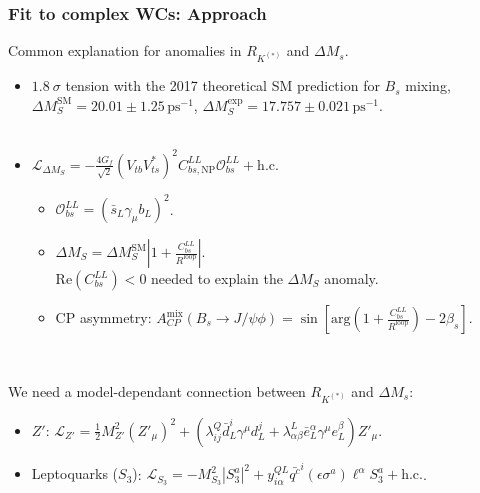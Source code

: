 \documentclass[mathserif, 10pt, dvipsnames]{beamer}
\newcommand\colorcite[1]{{\scriptsize\color{unizarblue}#1}}
\begin{document}
\begin{frame}\frametitle{Fit to complex WCs: Approach}
    Common explanation for anomalies in $R_{K^{(*)}}$ and $\Delta M_s$.
    \begin{itemize}
        \item $1.8\ \sigma$ tension with the 2017 theoretical SM prediction for $B_s$ mixing,\\
$\Delta M_S^\mathrm{SM} = 20.01 \pm 1.25\,\mathrm{ps}^{-1}$, \qquad
$\Delta M_S^\mathrm{exp} = 17.757 \pm 0.021
    \,\mathrm{ps}^{-1}$. \\
\colorcite{{L. Di Luzio, M. Kirk, A. Lenz. arXiv:1712.06572}}\\[0.5em]
\item $\mathcal{L}_{\Delta M_S} = -\frac{4 G_f}{\sqrt{2}}
    (V_{tb} V_{ts}^*)^2 C_{bs, \mathrm{NP}}^{LL}
    \mathcal{O}_{bs}^{LL} + \mathrm{h. c.}$
              \begin{itemize}
\item $ \mathcal{O}_{bs}^{LL} = (\bar{s}_L \gamma_\mu b_L)^2$.
\item $\Delta M_S = \Delta M_S^\mathrm{SM} \left|1 + \frac{C_{bs}^{LL} }{R^\mathrm{loop}} \right|$.\\ $\mathrm{Re}(C_{bs}^{LL})< 0$ needed to explain the $\Delta M_S$ anomaly.
\item CP asymmetry: $A_{CP}^\mathrm{mix} (B_s\to J/\psi \phi)= \sin \left[\mathrm{arg}\left(   1 + \frac{C_{bs}^{LL} }{R^\mathrm{loop}} \right) - 2 \beta_s \right] $.
              \end{itemize}
    \end{itemize}

    ~

    We need a model-dependant connection between $R_{K^{(*)}}$ and $\Delta M_s$:
    \begin{itemize}
\item {\color{blue}$Z'$}: $\mathcal{L}_{Z'} = \frac{1}{2} M_{Z'}^2 (Z'_\mu)^2 + (\lambda_{ij}^Q \bar{d}^i_L \gamma^\mu d^j_L + \lambda_{\alpha\beta}^L \bar{e}^\alpha_L \gamma^\mu e_L^\beta )Z'_\mu $.
\item {\color{red}Leptoquarks ($S_3$)}: $\mathcal{L}_{S_3} = -M^2_{S_3} |S_3^a|^2 + y_{i\alpha}^{QL} \bar{q^c}^i (\epsilon \sigma^a) \ell^\alpha S_3^a  + \mathrm{h.c.}$.
    \end{itemize}

\end{frame}
\end{document}

